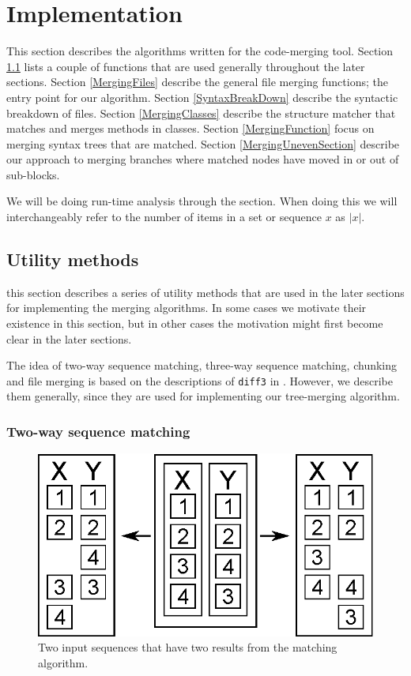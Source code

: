 \documentclass[11pt]{article}
\begin{document}
\section{Implementation}
This section describes the algorithms written for the code-merging tool. Section \ref{UtilitiyMethods} lists a couple of functions that are used generally throughout the later sections. Section \ref{MergingFiles} describe the general file merging functions; the entry point for our algorithm. Section \ref{SyntaxBreakDown} describe the syntactic breakdown of files. Section \ref{MergingClasses} describe the structure matcher that matches and merges methods in classes. Section \ref{MergingFunction} focus on merging syntax trees that are matched. Section \ref{MergingUnevenSection} describe our approach to merging branches where matched nodes have moved in or out of sub-blocks.

We will be doing run-time analysis through the section. When doing this we will interchangeably refer to the number of items in a set or sequence $x$ as $|x|$.


\subsection{Utility methods}
\label{UtilitiyMethods}
this section describes a series of utility methods that are used in the later sections for implementing the merging algorithms. In some cases we motivate their existence in this section, but in other cases the motivation might first become clear in the later sections.

The idea of two-way sequence matching, three-way sequence matching, chunking and file merging is based on the descriptions of \texttt{diff3} in \citet{Khanna}. However, we describe them generally, since they are used for implementing our tree-merging algorithm.

\subsubsection{Two-way sequence matching}
\begin{figure}
   \centerline{\includegraphics[scale=0.4]{drawings/eps/mincostsequencematchingambigious.eps}}
   \caption{Two input sequences that have two results from the matching algorithm.}
   \label{TwoWayMatchingAmbigiouty}
\end{figure}
\end{document}
